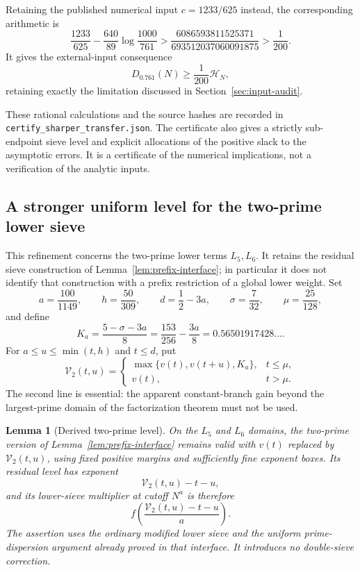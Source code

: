\documentclass[11pt]{article}
\newtheorem{lemma}[theorem]{Lemma}
\newcommand{\HN}{\mathcal H_N}
\begin{document}
Retaining the published numerical input $c=1233/625$ instead,
the corresponding arithmetic is
\[
 \frac{1233}{625}-\frac{640}{89}\log\frac{1000}{761}
 >\frac{6086593811525371}{693512037060091875}
 >\frac1{200}.
\]
It gives the external-input consequence
\begin{equation}\label{eq:sharper-761}
 D_{0.761}(N)\ge\frac1{200}\HN,
\end{equation}
retaining exactly the limitation discussed in
Section~\ref{sec:input-audit}.

These rational calculations and the source hashes are recorded in
\texttt{certify\_sharper\_transfer.json}. The certificate also gives
a strictly sub-endpoint sieve level and explicit allocations of the
positive slack to the asymptotic errors. It is a certificate of the
numerical implications, not a verification of the analytic inputs.


\subsection{A stronger uniform level for the two-prime lower sieve}
\label{sec:double-prefix-level}

This refinement concerns the two-prime lower terms $L_5,L_6$.
It retains the residual sieve construction of
Lemma~\ref{lem:prefix-interface}; in particular it does not identify
that construction with a prefix restriction of a global lower weight.
Set
\[
 a=\frac{100}{1149},\qquad h=\frac{50}{309},\qquad
 d=\frac12-3a,\qquad \sigma=\frac7{32},\qquad
 \mu=\frac{25}{128},
\]
and define
\[
 K_a=\frac{5-\sigma-3a}{8}
       =\frac{153}{256}-\frac{3a}{8}
       =0.56501917428\ldots .
\]
For $a\le u\le\min(t,h)$ and $t\le d$, put
\begin{equation}\label{eq:double-prefix-level}
 \mathcal V_2(t,u)=
 \begin{cases}
 \max\{v(t),v(t+u),K_a\},&t\le\mu,\\
 v(t),&t>\mu.
 \end{cases}
\end{equation}
The second line is essential: the apparent constant-branch gain
beyond the largest-prime domain of the factorization theorem
must not be used.

\begin{lemma}[Derived two-prime level]
\label{lem:double-prefix-level}
On the $L_5$ and $L_6$ domains, the two-prime version of
Lemma~\ref{lem:prefix-interface} remains valid with $v(t)$ replaced
by $\mathcal V_2(t,u)$, using fixed positive margins and sufficiently
fine exponent boxes. Its residual level has exponent
\[
 \mathcal V_2(t,u)-t-u,
\]
and its lower-sieve multiplier at cutoff $N^a$ is therefore
\[
 f\left(\frac{\mathcal V_2(t,u)-t-u}{a}\right).
\]
The assertion uses the ordinary modified lower sieve and the
uniform prime-dispersion argument already proved in that interface.
It introduces no double-sieve correction.
\end{lemma}
\end{document}
